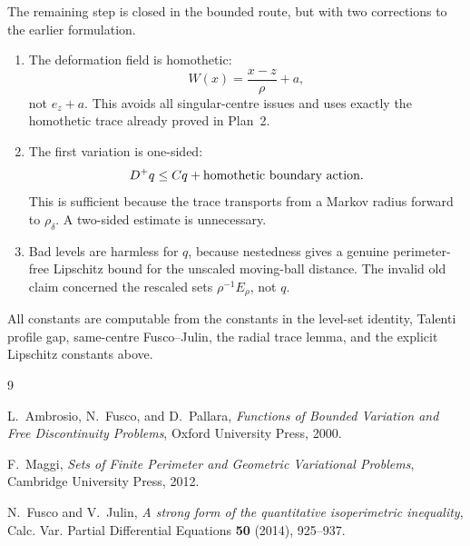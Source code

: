 \documentclass[11pt]{article}
\theoremstyle{definition}
\begin{document}
The remaining step is closed in the bounded route, but with two corrections
to the earlier formulation.

\begin{enumerate}[leftmargin=2em]
\item The deformation field is homothetic:
\[
   W(x)=\frac{x-z}{\rho}+a,
\]
not \(e_z+a\).  This avoids all singular-centre issues and uses exactly the
homothetic trace already proved in Plan~2.
\item The first variation is one-sided:
\[
   D^+q\le Cq+\hbox{homothetic boundary action}.
\]
This is sufficient because the trace transports from a Markov radius forward
to \(\rho_\delta\).  A two-sided estimate is unnecessary.
\item Bad levels are harmless for \(q\), because nestedness gives a genuine
perimeter-free Lipschitz bound for the unscaled moving-ball distance.  The
invalid old claim concerned the rescaled sets \(\rho^{-1}E_\rho\), not \(q\).
\end{enumerate}

All constants are computable from the constants in the level-set identity,
Talenti profile gap, same-centre Fusco--Julin, the radial trace lemma, and
the explicit Lipschitz constants above.

\begin{thebibliography}{9}

L.~Ambrosio, N.~Fusco, and D.~Pallara,
\emph{Functions of Bounded Variation and Free Discontinuity Problems},
Oxford University Press, 2000.

F.~Maggi,
\emph{Sets of Finite Perimeter and Geometric Variational Problems},
Cambridge University Press, 2012.

N.~Fusco and V.~Julin,
\emph{A strong form of the quantitative isoperimetric inequality},
Calc. Var. Partial Differential Equations \textbf{50} (2014), 925--937.

\end{thebibliography}
\end{document}
